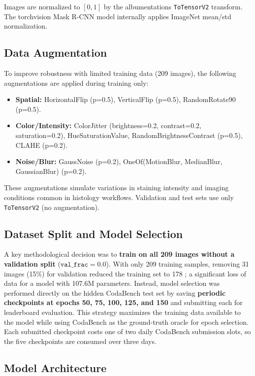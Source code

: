 \documentclass[12pt, a4paper]{article}
\begin{document}
Images are normalized to $[0, 1]$ by the albumentations \texttt{ToTensorV2} transform. The torchvision Mask R-CNN model internally applies ImageNet mean/std normalization.

\subsection{Data Augmentation}
To improve robustness with limited training data (209 images), the following augmentations are applied during training only:

\begin{itemize}
    \item \textbf{Spatial:} HorizontalFlip (p=0.5), VerticalFlip (p=0.5), RandomRotate90 (p=0.5).
    \item \textbf{Color/Intensity:} ColorJitter (brightness=0.2, contrast=0.2, saturation=0.2), HueSaturationValue, RandomBrightnessContrast (p=0.5), CLAHE (p=0.2).
    \item \textbf{Noise/Blur:} GaussNoise (p=0.2), OneOf(MotionBlur, MedianBlur, GaussianBlur) (p=0.2).
\end{itemize}

These augmentations simulate variations in staining intensity and imaging conditions common in histology workflows. Validation and test sets use only \texttt{ToTensorV2} (no augmentation).

\subsection{Dataset Split and Model Selection}
A key methodological decision was to \textbf{train on all 209 images without a validation split} ($\texttt{val\_frac}=0.0$). With only 209 training samples, removing 31 images (15\%) for validation reduced the training set to 178 ; a significant loss of data for a model with 107.6M parameters. Instead, model selection was performed directly on the hidden CodaBench test set by saving \textbf{periodic checkpoints at epochs 50, 75, 100, 125, and 150} and submitting each for leaderboard evaluation. This strategy maximizes the training data available to the model while using CodaBench as the ground-truth oracle for epoch selection. Each submitted checkpoint costs one of two daily CodaBench submission slots, so the five checkpoints are consumed over three days.

\subsection{Model Architecture}
\end{document}
